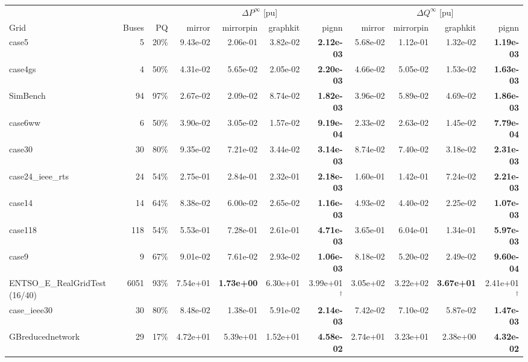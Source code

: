 \documentclass[10pt]{article}
\begin{document}
\begin{landscape}
\begin{table}[H]
\centering\scriptsize
\begin{tabular}{lrr rrrr rrrr}
\toprule
 & & & \multicolumn{4}{c}{$\Delta P^{\infty}$ [pu]} & \multicolumn{4}{c}{$\Delta Q^{\infty}$ [pu]} \\
\cmidrule(lr){4-7}\cmidrule(lr){8-11}
Grid & Buses & PQ & mirror & mirrorpin & graphkit & pignn & mirror & mirrorpin & graphkit & pignn \\
\midrule
case5 & 5 & 20\% & 9.43e-02 & 2.06e-01 & 3.82e-02 & \textbf{2.12e-03} & 5.68e-02 & 1.12e-01 & 1.32e-02 & \textbf{1.19e-03} \\
case4gs & 4 & 50\% & 4.31e-02 & 5.65e-02 & 2.05e-02 & \textbf{2.20e-03} & 4.66e-02 & 5.05e-02 & 1.53e-02 & \textbf{1.63e-03} \\
SimBench & 94 & 97\% & 2.67e-02 & 2.09e-02 & 8.74e-02 & \textbf{1.82e-03} & 3.96e-02 & 5.89e-02 & 4.69e-02 & \textbf{1.86e-03} \\
case6ww & 6 & 50\% & 3.90e-02 & 3.05e-02 & 1.57e-02 & \textbf{9.19e-04} & 2.33e-02 & 2.63e-02 & 1.45e-02 & \textbf{7.79e-04} \\
case30 & 30 & 80\% & 9.35e-02 & 7.21e-02 & 3.44e-02 & \textbf{3.14e-03} & 8.74e-02 & 7.40e-02 & 3.18e-02 & \textbf{2.31e-03} \\
case24\_ieee\_rts & 24 & 54\% & 2.75e-01 & 2.84e-01 & 2.32e-01 & \textbf{2.18e-03} & 1.60e-01 & 1.42e-01 & 7.24e-02 & \textbf{2.21e-03} \\
case14 & 14 & 64\% & 8.38e-02 & 6.00e-02 & 2.65e-02 & \textbf{1.16e-03} & 4.93e-02 & 4.40e-02 & 2.25e-02 & \textbf{1.07e-03} \\
case118 & 118 & 54\% & 5.53e-01 & 7.28e-01 & 2.61e-01 & \textbf{4.71e-03} & 3.65e-01 & 6.04e-01 & 1.34e-01 & \textbf{5.97e-03} \\
case9 & 9 & 67\% & 9.01e-02 & 7.61e-02 & 2.93e-02 & \textbf{1.06e-03} & 8.18e-02 & 5.20e-02 & 2.49e-02 & \textbf{9.60e-04} \\
ENTSO\_E\_RealGridTest\,(16/40) & 6051 & 93\% & 7.54e+01 & \textbf{1.73e+00} & 6.30e+01 & 3.99e+01$^\dagger$ & 3.05e+02 & 3.22e+02 & \textbf{3.67e+01} & 2.41e+01$^\dagger$ \\
case\_ieee30 & 30 & 80\% & 8.48e-02 & 1.38e-01 & 5.91e-02 & \textbf{2.14e-03} & 7.42e-02 & 7.10e-02 & 5.87e-02 & \textbf{1.47e-03} \\
GBreducednetwork & 29 & 17\% & 4.72e+01 & 5.39e+01 & 1.52e+01 & \textbf{4.58e-02} & 2.74e+01 & 3.23e+01 & 2.38e+00 & \textbf{4.32e-02} \\

\end{tabular}
\end{table}
\end{landscape}
\end{document}

